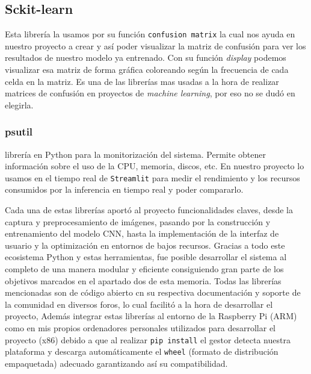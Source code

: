 \subsection{Sckit-learn}


Esta librería la usamos por su función \texttt{confusion matrix} la cual nos ayuda en nuestro proyecto a crear y así poder visualizar la matriz de confusión para ver los resultados de nuestro modelo ya entrenado. Con su función \textit{display} podemos visualizar esa matriz de forma gráfica coloreando según la frecuencia de cada celda en la matriz. 
Es una de las librerías mas usadas a la hora de realizar matrices de confusión en proyectos de \textit{machine learning}, por eso no se dudó en elegirla.



\subsubsection{psutil}


librería en Python para la monitorización del sistema. Permite obtener información sobre el uso de la CPU, memoria, discos, etc. En nuestro proyecto lo usamos en el tiempo real de \texttt{Streamlit} para  medir el rendimiento y los recursos consumidos por la inferencia en tiempo real y poder compararlo.

Cada una de estas librerías aportó al proyecto funcionalidades claves, desde la captura y preprocesamiento de imágenes, pasando por la construcción y entrenamiento del modelo CNN, hasta la implementación de la interfaz de usuario y la optimización en entornos de bajos recursos. Gracias a todo este ecosistema Python y estas herramientas, fue posible desarrollar el sistema al completo de una manera modular y eficiente consiguiendo gran parte de los objetivos marcados en el apartado dos de esta memoria. Todas las librerías mencionadas son de código abierto cn su respectiva documentación y soporte de la comunidad en diversos foros, lo cual facilitó a la hora de desarrollar el proyecto, Además integrar estas librerías al entorno de la Raspberry Pi (ARM) como en mis propios ordenadores personales utilizados para desarrollar el proyecto (x86) debido a que al realizar \texttt{pip install} el gestor detecta nuestra plataforma y descarga automáticamente el \texttt{wheel} (formato de distribución empaquetada) adecuado garantizando así su compatibilidad.




